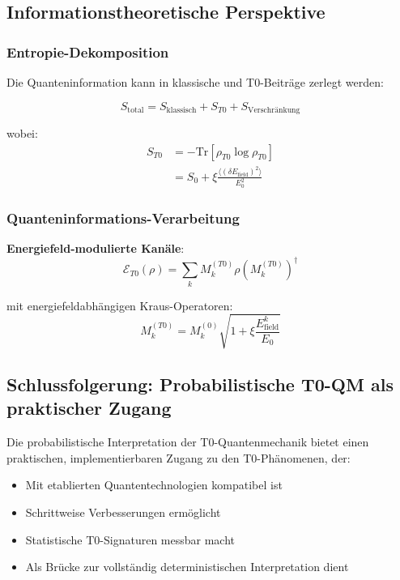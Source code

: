 \documentclass[12pt,a4paper]{article}
\newcommand{\xipar}{\xi}
\theoremstyle{definition}
\theoremstyle{remark}
\begin{document}
\subsection{Informationstheoretische Perspektive}

\subsubsection{Entropie-Dekomposition}

Die Quanteninformation kann in klassische und T0-Beiträge zerlegt werden:

\begin{equation}
	S_{\text{total}} = S_{\text{klassisch}} + S_{T0} + S_{\text{Verschränkung}}
	\label{eq:entropy_decomposition}
\end{equation}

wobei:
\begin{align}
	S_{T0} &= -\text{Tr}[\rho_{T0} \log \rho_{T0}] \\
	&= S_0 + \xipar \frac{\langle (\delta E_{\text{field}})^2 \rangle}{E_0^2}
\end{align}

\subsubsection{Quanteninformations-Verarbeitung}

\textbf{Energiefeld-modulierte Kanäle}:
\begin{equation}
	\mathcal{E}_{T0}(\rho) = \sum_k M_k^{(T0)} \rho (M_k^{(T0)})^\dagger
	\label{eq:t0_quantum_channel}
\end{equation}

mit energiefeldabhängigen Kraus-Operatoren:
\begin{equation}
	M_k^{(T0)} = M_k^{(0)} \sqrt{1 + \xipar \frac{E_{\text{field}}^k}{E_0}}
	\label{eq:t0_kraus_operators}
\end{equation}

\subsection{Schlussfolgerung: Probabilistische T0-QM als praktischer Zugang}

Die probabilistische Interpretation der T0-Quantenmechanik bietet einen praktischen, implementierbaren Zugang zu den T0-Phänomenen, der:

\begin{itemize}
	\item Mit etablierten Quantentechnologien kompatibel ist
	\item Schrittweise Verbesserungen ermöglicht  
	\item Statistische T0-Signaturen messbar macht
	\item Als Brücke zur vollständig deterministischen Interpretation dient
\end{itemize}
\end{document}
